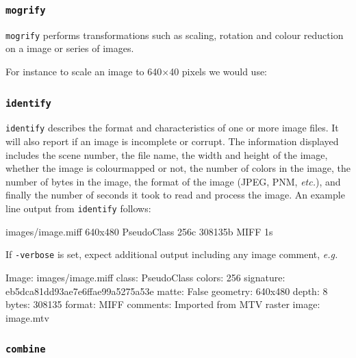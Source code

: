 \documentclass[twoside,11pt]{starlink}
\begin{document}
\subsubsection{\texttt{mogrify}}

\texttt{mogrify} performs transformations such as scaling, rotation and
colour reduction on a image or series of images.

For instance to scale an image to 640$\times$40 pixels we would use:

\begin{terminalv}
\end{terminalv}

\subsubsection{\texttt{identify}}

\texttt{identify} describes the format and characteristics of one or more
image files. It will also report if an image is incomplete or corrupt.
The information displayed includes the scene number, the file name,
the width and height of the image, whether the image is colourmapped
or not, the number of colors in the image, the number of bytes in the
image, the format of the image (JPEG, PNM, \emph{etc.}), and finally
the number of seconds it took to read and process the image. An
example line output from \texttt{identify} follows:

\begin{terminalv}
images/image.miff 640x480 PseudoClass 256c 308135b MIFF 1s
\end{terminalv}

If \texttt{-verbose} is set, expect additional output including any image comment, \emph{e.g.\ }

\begin{small}
\begin{terminalv}
Image: images/image.miff
  class: PseudoClass
  colors: 256
  signature: eb5dca81dd93ae7e6ffae99a5275a53e
  matte: False
  geometry: 640x480
  depth: 8
  bytes: 308135
  format: MIFF
  comments:
  Imported from MTV raster image:  image.mtv
\end{terminalv}
\end{small}

\subsubsection{\texttt{combine}}
\end{document}
